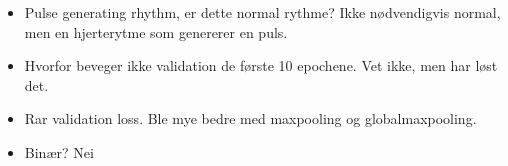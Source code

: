 \begin{itemize}
    \item Pulse generating rhythm, er dette normal rythme? Ikke nødvendigvis normal, men en hjerterytme som genererer en puls.
    \item Hvorfor beveger ikke validation de første 10 epochene. Vet ikke, men har løst det.
    \item Rar validation loss. Ble mye bedre med maxpooling og globalmaxpooling.
    \item Binær? Nei
\end{itemize}